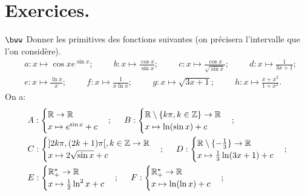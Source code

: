 \documentclass[11pt]{article}
\begin{document}
\pagebreak

\section{Exercices.}

\begin{exercice}{$\bww$}{}
    Donner les primitives des fonctions suivantes (on précisera l'intervalle que l'on considère).
    \begin{align*}
        &a:x\mapsto\cos{xe^{\sin{x}}}; \hspace{1cm} b:x\mapsto\frac{\cos x}{\sin x}; \hspace{1cm} c:x\mapsto\frac{\cos x}{\sqrt{\sin x}}; \hspace{1cm} d:x\mapsto\frac{1}{3x+1};\\
        &e:x\mapsto\frac{\ln x}{x}; \hspace{1cm} f:x\mapsto\frac{1}{x\ln x}; \hspace{1cm} g:x\mapsto\sqrt{3x+1}; \hspace{1cm} h:x\mapsto\frac{x+x^2}{1+x^2}.
    \end{align*}
    \tcblower
    On a:
    \begin{align*}
        &A:\begin{cases}\mathbb{R}\rightarrow\mathbb{R}\\x\mapsto e^{\sin x} + c\end{cases}; \hspace{0.5cm} B:\begin{cases}\mathbb{R}\setminus\{k\pi, k\in\mathbb{Z}\}\rightarrow\mathbb{R}\\x\mapsto\ln(\sin x) + c\end{cases}; \hspace{0.5cm}\\
        &C:\begin{cases}]2k\pi, (2k+1)\pi[, k\in\mathbb{Z}\rightarrow\mathbb{R}\\x\mapsto2\sqrt{\sin x} + c\end{cases}; \hspace{0.5cm} D:\begin{cases}\mathbb{R}\setminus\{-\frac{1}{3}\}\rightarrow\mathbb{R}\\x\mapsto\frac{1}{3}\ln(3x+1) + c\end{cases};\\
        &E:\begin{cases}\mathbb{R_+^*}\rightarrow\mathbb{R}\\x\mapsto\frac{1}{2}\ln^2x + c\end{cases}; \hspace{0.5cm} F:\begin{cases}\mathbb{R_+^*}\rightarrow\mathbb{R}\\x\mapsto\ln(\ln x) + c\end{cases};\\

\end{align*}
\end{exercice}
\end{document}
